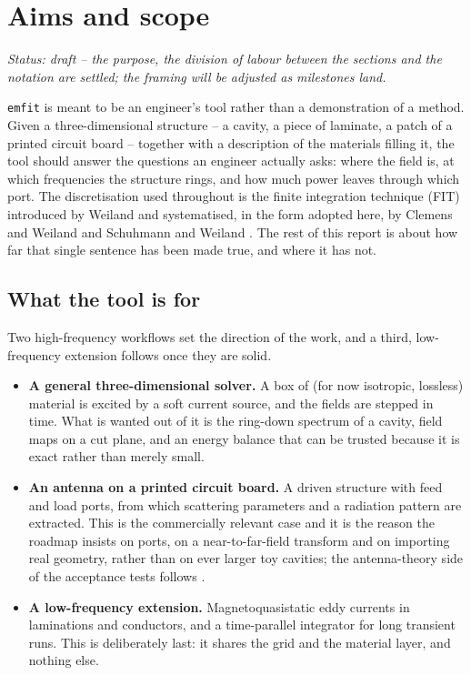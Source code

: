 \section{Aims and scope}

\noindent\emph{Status: draft -- the purpose, the division of labour between the sections and the notation are
settled; the framing will be adjusted as milestones land.}

\texttt{emfit} is meant to be an engineer's tool rather than a demonstration of a method. Given a
three-dimensional structure -- a cavity, a piece of laminate, a patch of a printed circuit board -- together with
a description of the materials filling it, the tool should answer the questions an engineer actually asks: where
the field is, at which frequencies the structure rings, and how much power leaves through which port. The
discretisation used throughout is the finite integration technique (FIT) introduced by Weiland
\cite{weiland1977,weiland1996} and systematised, in the form adopted here, by Clemens and Weiland
\cite{clemens2001} and Schuhmann and Weiland \cite{schuhmann2001}. The rest of this report is about how far that
single sentence has been made true, and where it has not.

\subsection{What the tool is for}

Two high-frequency workflows set the direction of the work, and a third, low-frequency extension follows once
they are solid.

\begin{itemize}[leftmargin=1.4em,itemsep=2pt]
  \item \textbf{A general three-dimensional solver.} A box of (for now isotropic, lossless) material is excited by
        a soft current source, and the fields are stepped in time. What is wanted out of it is the ring-down
        spectrum of a cavity, field maps on a cut plane, and an energy balance that can be trusted because it is
        exact rather than merely small.
  \item \textbf{An antenna on a printed circuit board.} A driven structure with feed and load ports, from which
        scattering parameters and a radiation pattern are extracted. This is the commercially relevant case and
        it is the reason the roadmap insists on ports, on a near-to-far-field transform and on importing real
        geometry, rather than on ever larger toy cavities; the antenna-theory side of the acceptance tests
        follows \cite{balanis2016}.
  \item \textbf{A low-frequency extension.} Magnetoquasistatic eddy currents in laminations and conductors, and a
        time-parallel integrator for long transient runs. This is deliberately last: it shares the grid and the
        material layer, and nothing else.
\end{itemize}

